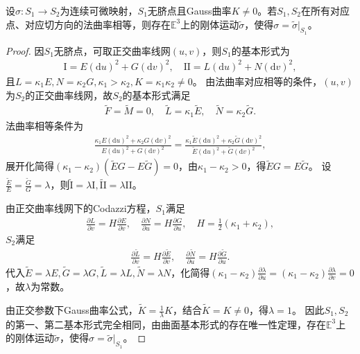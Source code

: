 \documentclass[../../main.tex]{subfiles}%
\begin{document}
\begin{theorem}
设$\sigma:S_1\to S_2$为连续可微映射，$S_1$无脐点且Gauss曲率$K\neq0$。若$S_1,S_2$在所有对应点、对应切方向的法曲率相等，则存在$\mathbb{E}^3$上的刚体运动$\tilde{\sigma}$，使得$\sigma=\tilde{\sigma}|_{S_1}$。
\end{theorem}
\begin{proof}

因$S_1$无脐点，可取正交曲率线网$(u,v)$，则$S_1$的基本形式为
\begin{align*}
\mathrm{I}=E(\mathrm{d}u)^2+G(\mathrm{d}v)^2,\quad \mathrm{II}=L(\mathrm{d}u)^2+N(\mathrm{d}v)^2,
\end{align*}
且$L=\kappa_1E,N=\kappa_2G,\kappa_1>\kappa_2,K=\kappa_1\kappa_2\neq0$。
由法曲率对应相等的条件，$(u,v)$为$S_2$的正交曲率线网，故$S_2$的基本形式满足
\begin{align*}
\tilde{F}=\tilde{M}=0,\quad \tilde{L}=\kappa_1\tilde{E},\quad \tilde{N}=\kappa_2\tilde{G}.
\end{align*}
法曲率相等条件为
\begin{align*}
\frac{\kappa_1E(\mathrm{d}u)^2+\kappa_2G(\mathrm{d}v)^2}{E(\mathrm{d}u)^2+G(\mathrm{d}v)^2}=
\frac{\kappa_1\tilde{E}(\mathrm{d}u)^2+\kappa_2\tilde{G}(\mathrm{d}v)^2}{\tilde{E}(\mathrm{d}u)^2+\tilde{G}(\mathrm{d}v)^2},
\end{align*}
展开化简得$(\kappa_1-\kappa_2)(\tilde{E}G-E\tilde{G})=0$，由$\kappa_1-\kappa_2>0$，得$\tilde{E}G=E\tilde{G}$。
设$\frac{\tilde{E}}{E}=\frac{\tilde{G}}{G}=\lambda$，则$\tilde{\mathrm{I}}=\lambda\mathrm{I},\tilde{\mathrm{II}}=\lambda\mathrm{II}$。

由正交曲率线网下的Codazzi方程，$S_1$满足
\begin{align*}
\frac{\partial L}{\partial v}=H\frac{\partial E}{\partial v},\quad \frac{\partial N}{\partial u}=H\frac{\partial G}{\partial u},\quad H=\frac{1}{2}(\kappa_1+\kappa_2),
\end{align*}
$S_2$满足
\begin{align*}
\frac{\partial\tilde{L}}{\partial v}=H\frac{\partial\tilde{E}}{\partial v},\quad \frac{\partial\tilde{N}}{\partial u}=H\frac{\partial\tilde{G}}{\partial u}.
\end{align*}
代入$\tilde{E}=\lambda E,\tilde{G}=\lambda G,\tilde{L}=\lambda L,\tilde{N}=\lambda N$，化简得$(\kappa_1-\kappa_2)\frac{\partial\lambda}{\partial u}=(\kappa_1-\kappa_2)\frac{\partial\lambda}{\partial v}=0$，故$\lambda$为常数。

由正交参数下Gauss曲率公式，$\tilde{K}=\frac{1}{\lambda}K$，结合$\tilde{K}=K\neq0$，得$\lambda=1$。
因此$S_1,S_2$的第一、第二基本形式完全相同，由曲面基本形式的存在唯一性定理，存在$\mathbb{E}^3$上的刚体运动$\tilde{\sigma}$，使得$\sigma=\tilde{\sigma}|_{S_1}$。

\end{proof}
\end{document}
